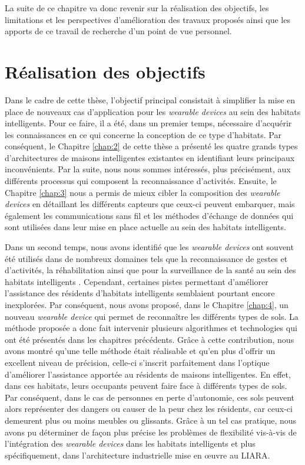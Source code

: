 La suite de ce chapitre va donc revenir sur la réalisation des objectifs, les limitations et les perspectives d'amélioration des travaux proposés ainsi que les apports de ce travail de recherche d'un point de vue personnel.

\section{Réalisation des objectifs}

Dans le cadre de cette thèse, l'objectif principal consistait à simplifier la mise en place de nouveaux cas d'application pour les \textit{wearable devices} au sein des habitats intelligents. Pour ce faire, il a été, dans un premier temps, nécessaire d'acquérir les connaissances en ce qui concerne la conception de ce type d'habitats. Par conséquent, le Chapitre \ref{chap:2} de cette thèse a présenté les quatre grands types d'architectures de maisons intelligentes existantes en identifiant leurs principaux inconvénients. Par la suite, nous nous sommes intéressés, plus précisément, aux différents processus qui composent la reconnaissance d'activités. Ensuite, le Chapitre \ref{chap:3} nous a permis de mieux cibler la composition des \textit{wearable devices} en détaillant les différents capteurs que ceux-ci peuvent embarquer, mais également les communications sans fil et les méthodes d'échange de données qui sont utilisées dans leur mise en place actuelle au sein des habitats intelligents.

Dans un second temps, nous avons identifié que les \textit{wearable devices} ont souvent été utilisés dans de nombreux domaines tels que la reconnaissance de gestes et d'activités, la réhabilitation ainsi que pour la surveillance de la santé au sein des habitats intelligents \citep{Khan2016,Davis2016,Chapron2018}. Cependant, certaines pistes permettant d'améliorer l'assistance des résidents d'habitats intelligents semblaient pourtant encore inexplorées. Par conséquent, nous avons proposé, dans le Chapitre \ref{chap:4}, un nouveau \textit{wearable device} qui permet de reconnaître les différents types de sols. La méthode proposée a donc fait intervenir plusieurs algorithmes et technologies qui ont été présentés dans les chapitres précédents. Grâce à cette contribution, nous avons montré qu'une telle méthode était réalisable et qu'en plus d'offrir un excellent niveau de précision, celle-ci s'inscrit parfaitement dans l'optique d'améliorer l'assistance apportée au résidents de maisons intelligentes. En effet, dans ces habitats, leurs occupants peuvent faire face à différents types de sols. Par conséquent, dans le cas de personnes en perte d'autonomie, ces sols peuvent alors représenter des dangers ou causer de la peur chez les résidents, car ceux-ci demeurent plus ou moins meubles ou glissants. Grâce à un tel cas pratique, nous avons pu déterminer de façon plus précise les problèmes de flexibilité vis-à-vis de l'intégration des \textit{wearable devices} dans les habitats intelligents et plus spécifiquement, dans l'architecture industrielle mise en \oe{}uvre au \ac{LIARA}.


